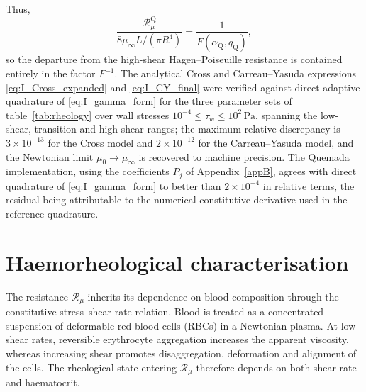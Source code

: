 \documentclass[lineno]{jfm}
\begin{document}
Thus,
\[
\frac{
\mathcal{R}_{\mu}^{\mathrm Q}
}{
8\mu_\infty L/(\pi R^4)
}
=
\frac{1}
{F(\alpha_{\mathrm Q},q_{\mathrm Q})},
\]
so the departure from the high-shear Hagen--Poiseuille resistance is contained
entirely in the factor $F^{-1}$.
The analytical Cross and Carreau--Yasuda expressions
\eqref{eq:I_Cross_expanded} and \eqref{eq:I_CY_final} were verified against
direct adaptive quadrature of \eqref{eq:I_gamma_form} for the three
parameter sets of table~\ref{tab:rheology} over wall stresses
$10^{-4}\leq\tau_w\leq10^{2}\,\mathrm{Pa}$, spanning the low-shear,
transition and high-shear ranges; the maximum relative discrepancy is
$3\times10^{-13}$ for the Cross model and $2\times10^{-12}$ for the
Carreau--Yasuda model, and the Newtonian limit
$\mu_0\rightarrow\mu_\infty$ is recovered to machine precision. The Quemada
implementation, using the coefficients $P_j$ of Appendix~\ref{appB}, agrees
with direct quadrature of \eqref{eq:I_gamma_form} to better than
$2\times10^{-4}$ in relative terms, the residual being attributable to the
numerical constitutive derivative used in the reference quadrature.
\section{Haemorheological characterisation}
\label{sec:hemochar}
The resistance $\mathcal{R}_{\mu}$ inherits its dependence on blood composition
through the constitutive stress--shear-rate relation. Blood is treated as a
concentrated suspension of deformable red blood cells (RBCs) in a Newtonian
plasma. At low shear rates, reversible erythrocyte aggregation increases the
apparent viscosity, whereas increasing shear promotes disaggregation,
deformation and alignment of the cells. The rheological state entering
$\mathcal{R}_{\mu}$ therefore depends on both shear rate and haematocrit.
\end{document}
